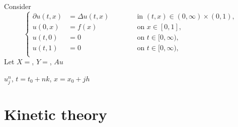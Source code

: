 \documentclass[a4paper]{article}
\begin{document}
\begin{ex}
Consider
\[\left\{\begin{alignedat}{2}
\partial u(t,x)&=\Delta u(t,x) &\qquad&\text{ in }(t,x)\in(0,\infty)\times(0,1),\\
u(0,x)&=f(x) &&\text{ on }x\in[0,1],\\
u(t,0)&=0 &&\text{ on }t\in[0,\infty),\\
u(t,1)&=0 &&\text{ on }t\in[0,\infty),\\
\end{alignedat}\right.\]
Let $X=$, $Y=$, $Au$
\end{ex}


$u_j^n$, $t=t_0+nk$, $x=x_0+jh$




\newpage
\section{Kinetic theory}
\end{document}

